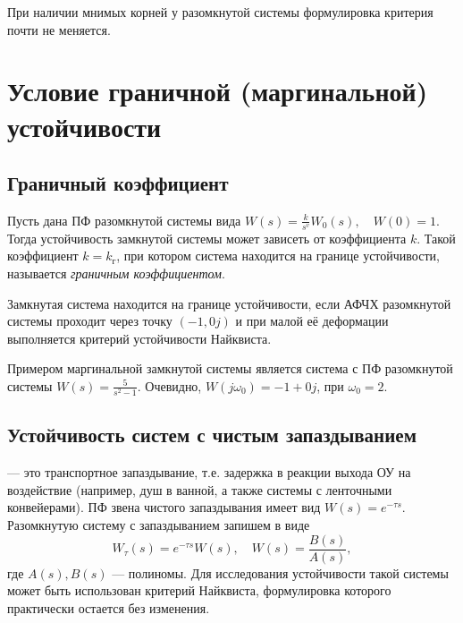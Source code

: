 \documentclass[../../TAU.tex]{subfiles}
\begin{document}
    При наличии мнимых корней у разомкнутой системы формулировка критерия почти не меняется.


\section{Условие граничной (маргинальной) устойчивости}


\subsection{Граничный коэффициент}

    Пусть дана ПФ разомкнутой системы вида 
    $W(s) =  \frac{k}{s^v}W_0(s), \quad W(0) = 1$. 
    Тогда устойчивость замкнутой системы может зависеть от коэффициента $k$. Такой коэффициент $k=k_\text{г}$, при котором система находится на границе устойчивости, называется {\it граничным коэффициентом}.

    \begin{theor}
        Замкнутая система находится на границе устойчивости, если АФЧХ разомкнутой системы проходит через точку $(-1,0j)$ и при малой её деформации выполняется  критерий устойчивости Найквиста.
    \end{theor}
    Примером маргинальной замкнутой системы является система с ПФ разомкнутой системы $W(s) = \frac{5}{s^2-1}$. Очевидно, $W(j\omega_0) = -1+0j$, при $\omega_0 = 2$.

\subsection{Устойчивость систем с чистым запаздыванием}

     --- это транспортное запаздывание, т.е. задержка в реакции выхода ОУ на воздействие (например, душ в ванной, а также системы с ленточными конвейерами). ПФ звена чистого запаздывания имеет вид 
    $W(s) = e^{-\tau s}$. 
    Разомкнутую систему с запаздыванием запишем в виде
    $$
    W_\tau(s) = e^{-\tau s} W(s), \quad W(s) = \frac{B(s)}{A(s)},
    $$
    где $A(s), B(s)$ --- полиномы.
    Для исследования устойчивости такой системы может быть использован критерий Найквиста, формулировка которого практически остается без изменения.
\end{document}
